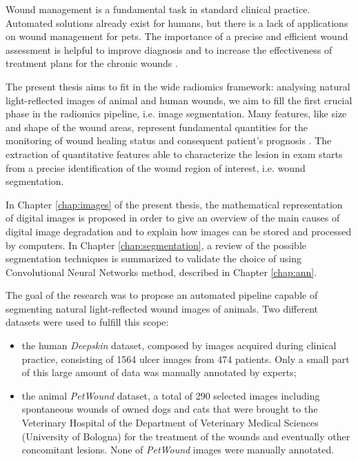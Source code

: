 \documentclass[../main.tex]{subfiles}
\begin{document}
Wound management is a fundamental task in standard clinical practice. 
Automated solutions already exist for humans, but there is a lack of applications on wound management for pets.
The importance of a precise and efficient wound assessment is helpful to improve diagnosis and to increase the effectiveness of treatment plans for the chronic wounds \cite{anisuzzaman2022image-wound-review}.

The present thesis aims to fit in the wide radiomics framework: analysing natural light-reflected images of animal and human wounds, we aim to fill the first crucial phase in the radiomics pipeline, i.e. image segmentation.
Many features, like size and shape of the wound areas, represent fundamental quantities for the monitoring of wound healing status and consequent patient’s prognosis \cite{gethin2006importance-wound-measurement}.
The extraction of quantitative features able to characterize the lesion in exam starts from a precise identification of the wound region of interest, i.e. wound segmentation.

In Chapter \ref{chap:images} of the present thesis, the mathematical representation of digital images is proposed in order to give an overview of the main causes of digital image degradation and to explain how images can be stored and processed by computers.
In Chapter \ref{chap:segmentation}, a review of the possible segmentation techniques is summarized to validate the choice of using Convolutional Neural Networks method, described in Chapter \ref{chap:ann}.

The goal of the research was to propose an automated pipeline capable of segmenting natural light-reflected wound images of animals. Two different datasets were used to fulfill this scope:  
\begin{itemize}
    \item the human \textit{Deepskin} dataset, composed by images acquired during clinical practice, consisting of 1564 ulcer images from 474 patients.
    Only a small part of this large amount of data was manually annotated by experts; 
    \item the animal \textit{PetWound} dataset, a total of 290 selected images including spontaneous wounds of owned dogs and cats that were brought to the Veterinary Hospital of the Department of Veterinary Medical Sciences (University of Bologna) for the treatment of the wounds and eventually other concomitant lesions.
    None of \textit{PetWound} images were manually annotated.
\end{itemize}
\end{document}
